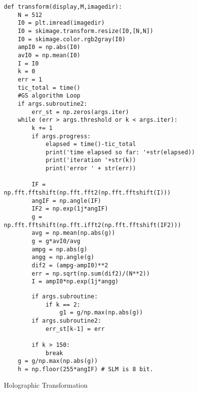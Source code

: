 

\newpage
\begin{figure}
\begin{lstlisting}
def transform(display,M,imagedir):
	N = 512
	I0 = plt.imread(imagedir)
	I0 = skimage.transform.resize(I0,[N,N])
	I0 = skimage.color.rgb2gray(I0)
	ampI0 = np.abs(I0)
	avI0 = np.mean(I0)
	I = I0
	k = 0
	err = 1
	tic_total = time()
	#GS algorithm Loop
	if args.subroutine2:
		err_st = np.zeros(args.iter)
	while (err > args.threshold or k < args.iter):
		k += 1
		if args.progress:
			elapsed = time()-tic_total
			print('time elapsed so far: '+str(elapsed))
			print('iteration '+str(k))
			print('error ' + str(err))

		IF = np.fft.fftshift(np.fft.fft2(np.fft.fftshift(I)))
		angIF = np.angle(IF)
		IF2 = np.exp(1j*angIF)
		g = np.fft.fftshift(np.fft.ifft2(np.fft.fftshift(IF2)))
		avg = np.mean(np.abs(g))
		g = g*avI0/avg
		ampg = np.abs(g)
		angg = np.angle(g)
		dif2 = (ampg-ampI0)**2
		err = np.sqrt(np.sum(dif2)/(N**2))
		I = ampI0*np.exp(1j*angg)
\end{lstlisting}
\end{figure}
\newpage
\begin{figure}
\begin{lstlisting}
		if args.subroutine:
			if k == 2:
				g1 = g/np.max(np.abs(g))
		if args.subroutine2:
			err_st[k-1] = err

		if k > 150:
			break
	g = g/np.max(np.abs(g))
	h = np.floor(255*angIF) # SLM is 8 bit.
	\end{lstlisting}
\caption{Holographic Transformation}
\end{figure}

